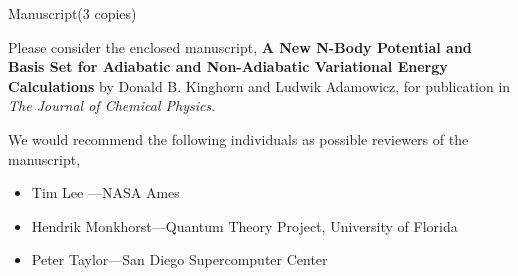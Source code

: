 \documentclass[12pt]{article}
\begin{document}
\begin{lettercc}
\end{lettercc}

\begin{letterencl}
Manuscript(3 copies)
\end{letterencl}

\begin{letteropening}
\end{letteropening}

Please consider the enclosed manuscript, \textbf{A New N-Body Potential and
Basis Set for Adiabatic and Non-Adiabatic Variational Energy Calculations}
by Donald B. Kinghorn and Ludwik Adamowicz, for publication in \emph{The
Journal of Chemical Physics}.

We would recommend the following individuals as possible reviewers of the
manuscript,

\begin{itemize}
\item  Tim Lee ---NASA Ames

\item  Hendrik Monkhorst---Quantum Theory Project, University of Florida

\item  Peter Taylor---San Diego Supercomputer Center
\end{itemize}
\end{document}
